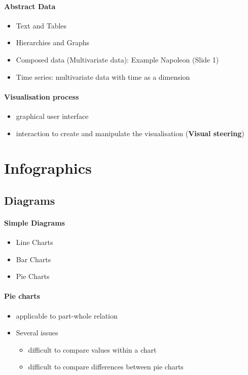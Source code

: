 \documentclass[10pt,a4paper]{article}
\begin{document}
	\paragraph{Abstract Data}
	\begin{itemize}
		\item Text and Tables
		\item Hierarchies and Graphs
		\item Composed data (Multivariate data): Example Napoleon (Slide 1)
		\item Time series: multivariate data with time as a dimension
	\end{itemize}
	\paragraph*{Visualisation process} 
	\begin{itemize}
		\item graphical user interface
		\item interaction to create and manipulate the visualisation (\textbf{Visual steering})
	\end{itemize}
	
\section{Infographics}
	
	\subsection{Diagrams}
	\paragraph{Simple Diagrams}
	\begin{itemize}
		\item Line Charts
		\item Bar Charts
		\item Pie Charts
	\end{itemize}
	
	\paragraph{Pie charts}
	\begin{itemize}
		\item applicable to part-whole relation
		\item Several issues 
		\begin{itemize}
			\item difficult to compare values within a chart
			\item difficult to compare differences between pie charts
		\end{itemize}
	\end{itemize}
	
\end{document}
